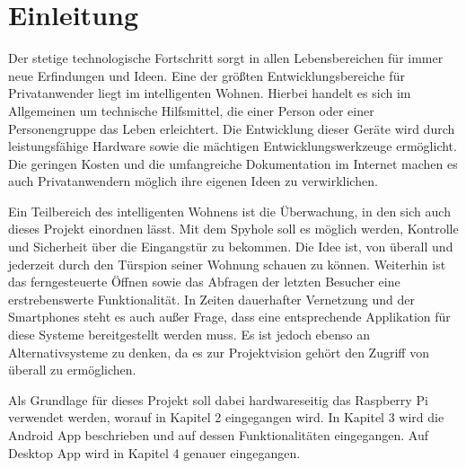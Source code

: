 
\chapter{Einleitung}
Der stetige technologische Fortschritt sorgt in allen Lebensbereichen für immer neue Erfindungen und Ideen. Eine der größten Entwicklungsbereiche für Privatanwender liegt im intelligenten Wohnen. Hierbei handelt es sich im Allgemeinen um technische Hilfsmittel, die einer Person oder einer Personengruppe das Leben erleichtert. Die Entwicklung dieser Geräte wird durch leistungsfähige Hardware sowie die mächtigen Entwicklungswerkzeuge ermöglicht. Die geringen Kosten und die umfangreiche Dokumentation im Internet machen es auch Privatanwendern möglich ihre eigenen Ideen zu verwirklichen.  
\par
Ein Teilbereich des intelligenten Wohnens ist die Überwachung, in den sich auch dieses Projekt einordnen lässt. Mit dem Spyhole soll es möglich werden, Kontrolle und Sicherheit über die Eingangstür zu bekommen. Die Idee ist, von überall und jederzeit durch den Türspion seiner Wohnung schauen zu können. Weiterhin ist das ferngesteuerte Öffnen sowie das Abfragen der letzten Besucher eine erstrebenswerte Funktionalität. In Zeiten dauerhafter Vernetzung und der Smartphones steht es auch außer Frage, dass eine entsprechende Applikation für diese Systeme bereitgestellt werden muss. Es ist jedoch ebenso an Alternativsysteme zu denken, da es zur Projektvision gehört den Zugriff von überall zu ermöglichen. 
\par
Als Grundlage für dieses Projekt soll dabei hardwareseitig das Raspberry Pi verwendet werden, worauf in Kapitel 2 eingegangen wird. In Kapitel 3 wird die Android App beschrieben und auf dessen Funktionalitäten eingegangen. Auf Desktop App wird in Kapitel 4 genauer eingegangen.